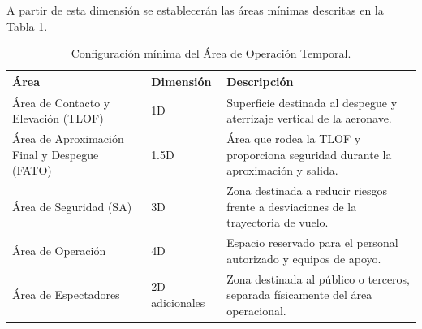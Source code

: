 A partir de esta dimensión se establecerán las áreas mínimas descritas en la Tabla \ref{tab:dronpuerto}.

\begin{table}[H]

\centering
\renewcommand{\arraystretch}{1.4}

\begin{tabularx}{\textwidth}{|p{4cm}|p{2cm}|X|}

\hline

\textbf{Área}
&
\textbf{Dimensión}
&
\textbf{Descripción}

\\ \hline

Área de Contacto y Elevación (TLOF)

&

1D

&

Superficie destinada al despegue y aterrizaje vertical de la aeronave.

\\ \hline

Área de Aproximación Final y Despegue (FATO)

&

1.5D

&

Área que rodea la TLOF y proporciona seguridad durante la aproximación y salida.

\\ \hline

Área de Seguridad (SA)

&

3D

&

Zona destinada a reducir riesgos frente a desviaciones de la trayectoria de vuelo.

\\ \hline

Área de Operación

&

4D

&

Espacio reservado para el personal autorizado y equipos de apoyo.

\\ \hline

Área de Espectadores

&

2D adicionales

&

Zona destinada al público o terceros, separada físicamente del área operacional.

\\ \hline

\end{tabularx}

\caption{Configuración mínima del Área de Operación Temporal.}

\label{tab:dronpuerto}

\end{table}

